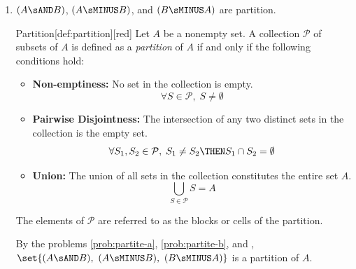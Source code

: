 \begin{enumerate}
\begin{enumerate}
    \item $(A \sAND B)$, $(A \sMINUS B)$, and $(B \sMINUS A)$ are partition.
    \begin{define}{Partition}[def:partition][red]
      Let $A$ be a nonempty set. A collection $\mathcal{P}$ of subsets of $A$ is defined as a \emph{partition} of $A$ if and only if the following conditions hold:
      \begin{itemize}
        \item[\textbf{1.}] \textbf{Non-emptiness:} No set in the collection is empty.
          $$ \forall S \in \mathcal{P}, \; S \neq \emptyset $$
        \item[\textbf{2.}] \textbf{Pairwise Disjointness:} The intersection of any two distinct sets in the collection is the empty set.
          $$ \forall S_1, S_2 \in \mathcal{P}, \; S_1 \neq S_2 \THEN S_1 \cap S_2 = \emptyset $$
        \item[\textbf{3.}] \textbf{Union:} The union of all sets in the collection constitutes the entire set $A$.
          $$ \bigcup_{S \in \mathcal{P}} S = A $$
      \end{itemize}
      The elements of $\mathcal{P}$ are referred to as the blocks or cells of the partition.
    \end{define}
    \begin{subprove}
      By the problems \ref{prob:partite-a}, \ref{prob:partite-b}, and , 
      $\set{(A \sAND B),\ (A \sMINUS B),\ (B \sMINUS A)}$ is a partition of $A$.
    \end{subprove}



  \end{enumerate}
  





\end{enumerate}
